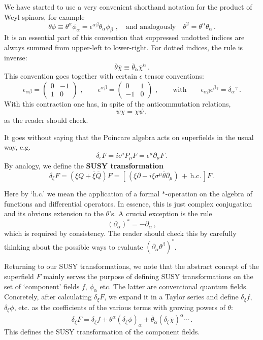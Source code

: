 \documentclass[12pt]{article}
\newcommand{\be}{\begin{equation}}
\newcommand{\ee}{\end{equation}}
\newcommand{\ol}{\overline}
\numberwithin{equation}{section}
\begin{document}
We have started to use a very convenient shorthand notation for the product of Weyl spinors, for example
\be
\theta\phi\equiv \theta^\alpha\phi_\alpha=\epsilon^{\alpha\beta}\theta_\alpha \phi_\beta\,\,,\quad\mbox{and analogously}\quad \theta^2=\theta^\alpha\theta_\alpha\,.
\ee
It is an essential part of this convention that suppressed undotted indices are always summed from upper-left to lower-right. For dotted indices, the rule is inverse:
\be
\ol{\theta}\ol{\chi}\equiv \ol{\theta}_{\dot{\alpha}}\ol{\chi}^{\dot{\alpha}}\,.
\ee
This convention goes together with certain $\epsilon$ tensor conventions:
\be
\epsilon_{\alpha\beta}=\left(\begin{array}{cc} 0 & -1 \\ 1 & 0 \end{array}
\right)\,\,,\qquad 
\epsilon^{\alpha\beta}=\left(\begin{array}{cc} 0 & 1 \\ -1 & 0 \end{array}
\right)\,\,,\qquad \mbox{with} \qquad 
\epsilon_{\alpha\beta}\epsilon^{\beta\gamma}=\delta_\alpha{}^\gamma\,.
\ee
With this contraction one has, in spite of the anticommutation relations,
\be
\psi\chi=\chi\psi\,,
\ee
as the reader should check. 

It goes without saying that the Poincare algebra acts on superfields in the usual way, e.g.
\be
\delta_\epsilon F=i\epsilon^\mu P_\mu F = \epsilon^\mu\partial_\mu F\,.
\ee
By analogy, we define the {\bf SUSY transformation}
\be
\delta_\xi F=(\xi Q+\ol{\xi}\ol{Q})F=[\,(\xi\partial-i\xi \sigma^\mu\ol{\theta} \partial_\mu)\,+\,\mbox{h.c.}\,]F\,.
\ee

Here by `h.c.' we mean the application of a formal $*$-operation on the algebra of functions and differential operators. In essence, this is just complex conjugation and its obvious extension to the $\theta$'s. A crucial exception is the rule
\be
(\partial_\alpha)^*=-\ol{\partial}_{\dot{\alpha}}\,,
\ee
which is required by consistency. The reader should check this by carefully thinking about the possible ways to evaluate $(\partial_\alpha\theta^\beta)^*$. 

Returning to our SUSY transformations, we note that the abstract concept of the superfield $F$ mainly serves the purpose of defining SUSY transformations on the set of `component' fields $f$, $\phi_\alpha$ etc. The latter are conventional quantum fields. Concretely, after calculating $\delta_\xi F$, we expand it in a Taylor series and define $\delta_\xi f$, $\delta_\xi\phi$, etc. as the coefficients of the various terms with growing powers of $\theta$:
\be
\delta_\xi F=\delta_\xi f+\theta^\alpha(\delta_\xi\phi)_\alpha+\ol{\theta}_{\dot{\alpha}}(\delta_\xi\ol{\chi})^{\dot{\alpha}}\cdots\,.
\ee
This defines the SUSY transformation of the component fields. 
\end{document}
